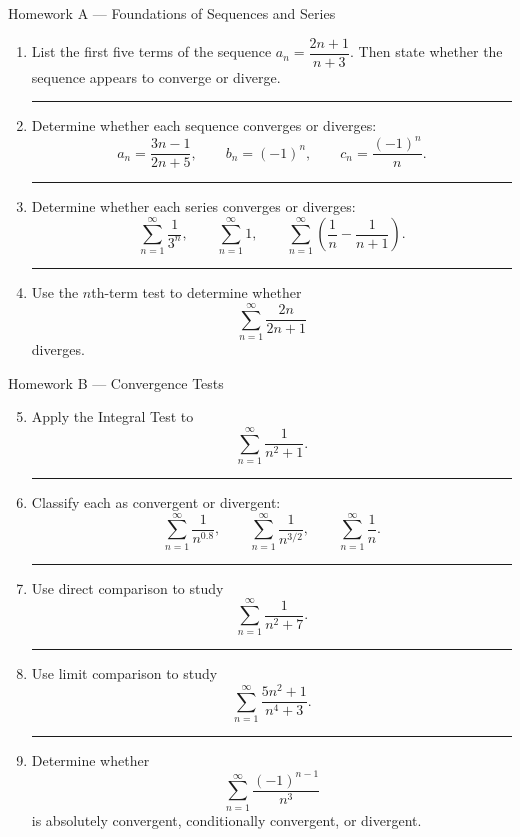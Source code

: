 \documentclass[11pt]{article}
\newcommand{\hwspace}{\vspace{0.8em}\hrule\vspace{0.8em}}
\begin{document}
\begin{homeworkset}{Homework A --- Foundations of Sequences and Series}
\begin{enumerate}
    \item List the first five terms of the sequence \(a_n=\dfrac{2n+1}{n+3}\). Then state whether the sequence appears to converge or diverge.
    \hwspace

    \item Determine whether each sequence converges or diverges:
    \[
    a_n=\frac{3n-1}{2n+5},
    \qquad
    b_n=(-1)^n,
    \qquad
    c_n=\frac{(-1)^n}{n}.
    \]
    \hwspace

    \item Determine whether each series converges or diverges:
    \[
    \sum_{n=1}^{\infty}\frac{1}{3^n},
    \qquad
    \sum_{n=1}^{\infty}1,
    \qquad
    \sum_{n=1}^{\infty}\left(\frac1n-\frac1{n+1}\right).
    \]
    \hwspace

    \item Use the \(n\)th-term test to determine whether
    \[
    \sum_{n=1}^{\infty}\frac{2n}{2n+1}
    \]
    diverges.
\end{enumerate}
\end{homeworkset}
\newpage
\begin{homeworkset}{Homework B --- Convergence Tests}
\begin{enumerate}
\setcounter{enumi}{4}
    \item Apply the Integral Test to
    \[
    \sum_{n=1}^{\infty}\frac{1}{n^2+1}.
    \]
    \hwspace

    \item Classify each as convergent or divergent:
    \[
    \sum_{n=1}^{\infty}\frac{1}{n^{0.8}},
    \qquad
    \sum_{n=1}^{\infty}\frac{1}{n^{3/2}},
    \qquad
    \sum_{n=1}^{\infty}\frac{1}{n}.
    \]
    \hwspace

    \item Use direct comparison to study
    \[
    \sum_{n=1}^{\infty}\frac{1}{n^2+7}.
    \]
    \hwspace

    \item Use limit comparison to study
    \[
    \sum_{n=1}^{\infty}\frac{5n^2+1}{n^4+3}.
    \]
    \hwspace

    \item Determine whether
    \[
    \sum_{n=1}^{\infty}\frac{(-1)^{n-1}}{n^3}
    \]
    is absolutely convergent, conditionally convergent, or divergent.
\end{enumerate}
\end{homeworkset}
\end{document}

